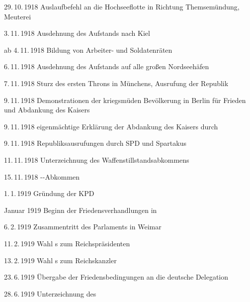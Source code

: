 \begin{chronik}
\item[29.\,10.\,1918]
Auslaufbefehl an die Hochseeflotte in Richtung Themsemündung, Meuterei

\item[3.\,11.\,1918]
Ausdehnung des Aufstands nach Kiel

\item[ab 4.\,11.\,1918]
Bildung von Arbeiter- und Soldatenräten

\item[6.\,11.\,1918]
Ausdehnung des Aufstands auf alle großen Nordseehäfen

\item[7.\,11.\,1918]
Sturz des ersten Throns in Münchens, Ausrufung der Republik

\item[9.\,11.\,1918]
Demonstrationen der kriegsmüden Bevölkerung in Berlin für Frieden und
Abdankung des Kaisers

\item[9.\,11.\,1918]
eigenmächtige Erklärung der Abdankung des Kaisers durch 

\item[9.\,11.\,1918]
Republiksausrufungen durch SPD und Spartakus

\item[11.\,11.\,1918]
Unterzeichnung des Waffenstillstandsabkommens

\item[15.\,11.\,1918]
--Abkommen

\item[1.\,1.\,1919]
Gründung der KPD

\item[Januar 1919]
Beginn der Friedensverhandlungen in 

\item[6.\,2.\,1919]
Zusammentritt des Parlaments in Weimar

\item[11.\,2.\,1919]
Wahl s zum
Reichspräsidenten

\item[13.\,2.\,1919]
Wahl s zum
Reichskanzler

\item[23.\,6.\,1919]
Übergabe der Friedensbedingungen an die deutsche Delegation

\item[28.\,6.\,1919]
Unterzeichnung des 


\end{chronik}
